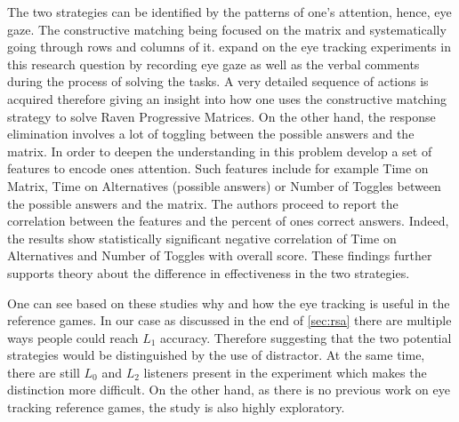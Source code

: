 \documentclass[11pt,a4paper]{article}
\begin{document}
The two strategies can be identified by the patterns of one's attention, hence, eye gaze. The constructive matching being focused on the matrix and systematically going through rows and columns of it. \cite{Carpenter_1990} expand on the eye tracking experiments in this research question by recording eye gaze as well as the verbal comments during the process of solving the tasks. A very detailed sequence of actions is acquired therefore giving an insight into how one uses the constructive matching strategy to solve Raven Progressive Matrices. On the other hand, the response elimination involves a lot of toggling between the possible answers and the matrix. In order to deepen the understanding in this problem \cite{Vigneau_2006} develop a set of features to encode ones attention. Such features include for example Time on Matrix, Time on Alternatives (possible answers) or Number of Toggles between the possible answers and the matrix. The authors proceed to report the correlation between the features and the percent of ones correct answers. Indeed, the results show statistically significant negative correlation of Time on Alternatives and Number of Toggles with overall score. These findings further supports theory about the difference in effectiveness in the two strategies. 


One can see based on these studies why and how the eye tracking is useful in the reference games. In our case as discussed in the end of \autoref{sec:rsa} there are multiple ways people could reach $L_1$ accuracy. Therefore suggesting that the two potential strategies would be distinguished by the use of distractor. At the same time, there are still $L_0$ and $L_2$ listeners present in the experiment which makes the distinction more difficult. On the other hand, as there is no previous work on eye tracking reference games, the study is also highly exploratory.
\end{document}
